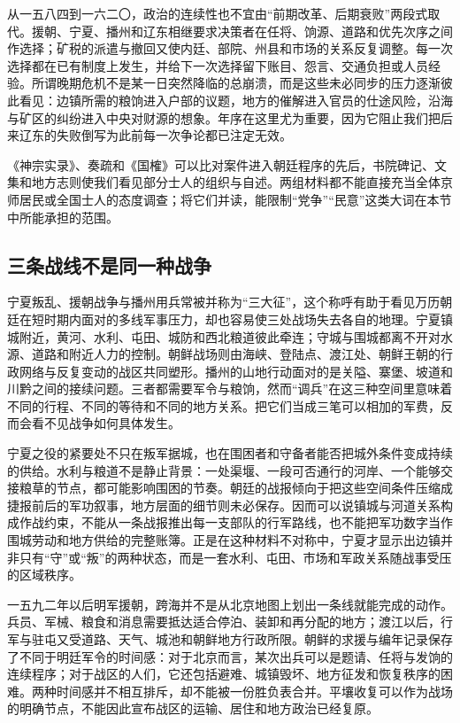 从一五八四到一六二〇，政治的连续性也不宜由“前期改革、后期衰败”两段式取代。援朝、宁夏、播州和辽东相继要求决策者在任将、饷源、道路和优先次序之间作选择；矿税的派遣与撤回又使内廷、部院、州县和市场的关系反复调整。每一次选择都在已有制度上发生，并给下一次选择留下账目、怨言、交通负担或人员经验。所谓晚期危机不是某一日突然降临的总崩溃，而是这些未必同步的压力逐渐彼此看见：边镇所需的粮饷进入户部的议题，地方的催解进入官员的仕途风险，沿海与矿区的纠纷进入中央对财源的想象。年序在这里尤为重要，因为它阻止我们把后来辽东的失败倒写为此前每一次争论都已注定无效。

\begin{sourcenote}[宫廷案件与士人网络能说明什么]
《神宗实录》、奏疏和《国榷》可以比对案件进入朝廷程序的先后，书院碑记、文集和地方志则使我们看见部分士人的组织与自述。两组材料都不能直接充当全体京师居民或全国士人的态度调查；将它们并读，能限制“党争”“民意”这类大词在本节中所能承担的范围。
\end{sourcenote}

\subsection{三条战线不是同一种战争}

宁夏叛乱、援朝战争与播州用兵常被并称为“三大征”，这个称呼有助于看见万历朝廷在短时期内面对的多线军事压力，却也容易使三处战场失去各自的地理。宁夏镇城附近，黄河、水利、屯田、城防和西北粮道彼此牵连；守城与围城都离不开对水源、道路和附近人力的控制。朝鲜战场则由海峡、登陆点、渡江处、朝鲜王朝的行政网络与反复变动的战区共同塑形。播州的山地行动面对的是关隘、寨堡、坡道和川黔之间的接续问题。三者都需要军令与粮饷，然而“调兵”在这三种空间里意味着不同的行程、不同的等待和不同的地方关系。把它们当成三笔可以相加的军费，反而会看不见战争如何具体发生。

宁夏之役的紧要处不只在叛军据城，也在围困者和守备者能否把城外条件变成持续的供给。水利与粮道不是静止背景：一处渠堰、一段可否通行的河岸、一个能够交接粮草的节点，都可能影响围困的节奏。朝廷的战报倾向于把这些空间条件压缩成捷报前后的军功叙事，地方层面的细节则未必保存。因而可以说镇城与河道关系构成作战约束，不能从一条战报推出每一支部队的行军路线，也不能把军功数字当作围城劳动和地方供给的完整账簿。正是在这种材料不对称中，宁夏才显示出边镇并非只有“守”或“叛”的两种状态，而是一套水利、屯田、市场和军政关系随战事受压的区域秩序。

一五九二年以后明军援朝，跨海并不是从北京地图上划出一条线就能完成的动作。兵员、军械、粮食和消息需要抵达适合停泊、装卸和再分配的地方；渡江以后，行军与驻屯又受道路、天气、城池和朝鲜地方行政所限。朝鲜的求援与编年记录保存了不同于明廷军令的时间感：对于北京而言，某次出兵可以是题请、任将与发饷的连续程序；对于战区的人们，它还包括避难、城镇毁坏、地方征发和恢复秩序的困难。两种时间感并不相互排斥，却不能被一份胜负表合并。平壤收复可以作为战场的明确节点，不能因此宣布战区的运输、居住和地方政治已经复原。

